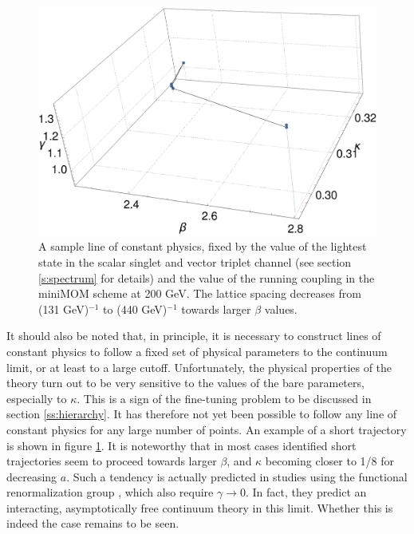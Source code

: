 \documentclass[final,twoside,12pt]{article}
\newcommand*{\1}{1\!\!\!\bot}
\begin{document}
\begin{figure}[!htbp]
\begin{minipage}{0.7\linewidth}
\includegraphics[width=\linewidth]{lcp-example}
\end{minipage}
\begin{minipage}{0.3\linewidth}
\caption{\label{fig:lcpex}A sample line of constant physics, fixed by the value of the lightest state in the scalar singlet and vector triplet channel (see section \ref{s:spectrum} for details) and the value of the running coupling in the miniMOM scheme at 200 GeV. The lattice spacing decreases from (131 GeV)$^{-1}$ to (440 GeV)$^{-1}$ towards larger $\beta$ values.}
\end{minipage}
\end{figure}

It should also be noted that, in principle, it is necessary to construct lines of constant physics \cite{Montvay:1994cy,Gattringer:2010zz,DeGrand:2006zz} to follow a fixed set of physical parameters to the continuum limit, or at least to a large cutoff. Unfortunately, the physical properties of the theory turn out to be very sensitive to the values of the bare parameters, especially to $\kappa$. This is a sign of the fine-tuning problem to be discussed in section \ref{ss:hierarchy}. It has therefore not yet been possible to follow any line of constant physics for any large number of points. An example of a short trajectory is shown in figure \ref{fig:lcpex}. It is noteworthy that in most cases identified short trajectories seem to proceed towards larger $\beta$, and $\kappa$ becoming closer to 1/8 for decreasing $a$. Such a tendency is actually predicted in studies using the functional renormalization group \cite{Gies:2015lia,Gies:2016kkk}, which also require $\gamma\to 0$. In fact, they predict an interacting, asymptotically free continuum theory in this limit. Whether this is indeed the case remains to be seen.
\end{document}
